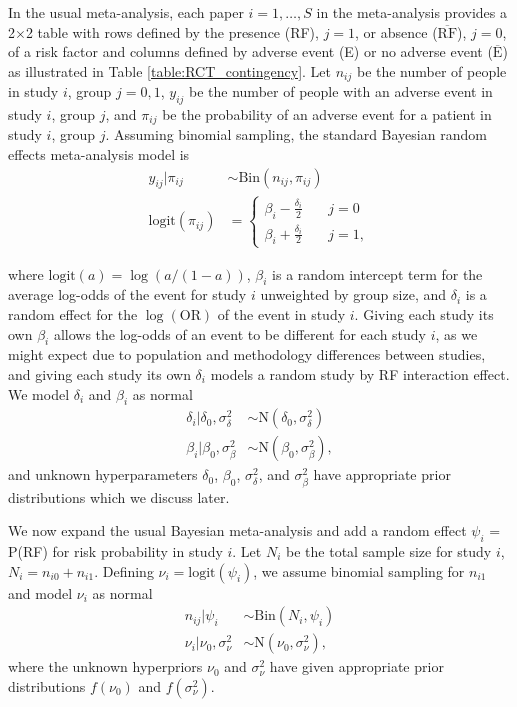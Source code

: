 \documentclass[AMA,STIX1COL]{WileyNJD-v2}
\newcommand{\Ebar}{\overline{\mbox{E}}}
\newcommand{\RFbar}{\overline{\mbox{RF}}}
\begin{document}
In the usual meta-analysis, each paper $i = 1, \dots, S$ in the meta-analysis provides a 2$\times$2 table with rows defined by the presence (RF), $j = 1$, or absence ($\RFbar$), $j = 0$, of a risk factor and columns defined by adverse event (E) or no adverse event ($\Ebar$) as illustrated in Table \ref{table:RCT_contingency}. Let $n_{ij}$ be the number of people in study $i$, group $j=0,1$, $y_{ij}$ be the number of people with an adverse event in study $i$, group $j$, and $\pi_{ij}$ be the probability of an adverse event for a patient in study $i$, group $j$. Assuming binomial sampling, the standard Bayesian random effects meta-analysis model is 
\begin{align}
y_{ij} \vert \pi_{ij} & \sim \mbox{Bin}(n_{ij}, \pi_{ij})  \label{eq:RCT_likelihood}\\
\mbox{logit}(\pi_{ij}) & =  \left\{
                  \begin{array}{ll}
                    \beta_{i} - \frac{\delta_i}{2} & \quad j=0 \\ 
                    \beta_{i} + \frac{\delta_i}{2} & \quad j=1,
                  \end{array}
                \right. \label{eq:RCT_logit}
\end{align}

\noindent where $\mbox{logit}(a) = \log(a/(1-a))$, $\beta_i$ is a random intercept term for the average log-odds of the event for study $i$ unweighted by group size, and $\delta_i$ is a random effect for the $\log(\mbox{OR})$ of the event in study $i$. Giving each study its own $\beta_i$ allows the log-odds of an event to be different for each study $i$, as we might expect due to population and methodology differences between studies, and giving each study its own $\delta_i$ models a random study by RF interaction effect. We model $\delta_i$ and $\beta_i$ as normal
\begin{align}
\delta_i \vert \delta_0, \sigma^2_{\delta} & \sim \mbox{N}(\delta_0, \sigma^2_{\delta}) \label{eq:deltai} \\
\beta_i \vert \beta_0, \sigma^2_{\beta} & \sim \mbox{N}(\beta_0, \sigma^2_{\beta}), \label{eq:betai}
\end{align}
\noindent and unknown hyperparameters $\delta_0$, $\beta_0$, $\sigma^2_{\delta}$, and $\sigma^2_{\beta}$ have appropriate prior distributions which we discuss later. 

We now expand the usual Bayesian meta-analysis and add a random effect $\psi_i$ = P(RF) for risk probability in study $i$. Let $N_i$ be the total sample size for study $i$, $N_i = n_{i0} + n_{i1}$. Defining $\nu_i = \mbox{logit}(\psi_i)$, we assume binomial sampling for $n_{i1}$ and model $\nu_i$ as normal
\begin{align}
n_{ij} \vert \psi_i &\sim \mbox{Bin}(N_i, \psi_i) \label{eq:nij} \\
\nu_i \vert \nu_0, \sigma^2_\nu & \sim \mbox{N}(\nu_0, \sigma^2_\nu), \label{eq:nui}
\end{align}
\noindent where the unknown hyperpriors $\nu_0$ and $\sigma^2_\nu$ have given appropriate prior distributions $f(\nu_0)$ and $f(\sigma^2_{\nu})$. 
\end{document}
